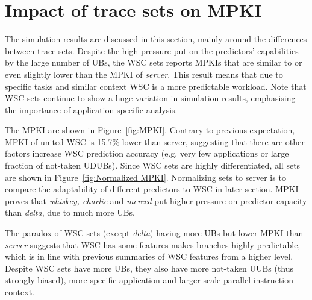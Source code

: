 \section{Impact of trace sets on MPKI}

The simulation results are discussed in this section, mainly around the differences between trace sets. Despite the high pressure put on the predictors' capabilities by the large number of UBs, the WSC sets reports MPKIs that are similar to or even slightly lower than the MPKI of \textit{server}. This result means that due to specific tasks and similar context\cite{barroso_datacenter_2013} WSC is a more predictable workload. Note that WSC sets continue to show a huge variation in simulation results, emphasising the importance of application-specific analysis.\par\hspace*{\fill}\par

The MPKI are shown in Figure~\ref{fig:MPKI}. Contrary to previous expectation, MPKI of united WSC is 15.7\% lower than server, suggesting that there are other factors increase WSC prediction accuracy (e.g. very few applications or large fraction of not-taken UDUBs). Since WSC sets are highly differentiated, all sets are shown in Figure~\ref{fig:Normalized MPKI}. Normalizing sets to server is to compare the adaptability of different predictors to WSC in later section. MPKI proves that \textit{whiskey, charlie} and \textit{merced} put higher pressure on predictor capacity than \textit{delta}, due to much more UBs.\par\hspace*{\fill}\par


The paradox of WSC sets (except \textit{delta}) having more UBs but lower MPKI than \textit{server} suggests that WSC has some features makes branches highly predictable, which is in line with previous summaries of WSC features from a higher level. Despite WSC sets have more UBs, they also have more not-taken UUBs (thus strongly biased), more specific application and larger-scale parallel instruction context. \par\hspace*{\fill}\par

